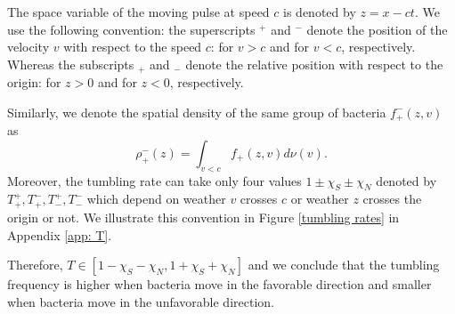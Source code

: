 \documentclass[11pt,twoside]{article}
\numberwithin{equation}{section}
\theoremstyle{plain}
\theoremstyle{nonumberplain}
\begin{document}
The space variable of the moving pulse at speed $c$ is denoted by $z = x-ct$.
We use the following convention: the superscripts $^+$ and $^-$ denote the position of the velocity $v$ with respect to the speed $c$: for $v>c$ and for $v<c$, respectively. Whereas the subscripts $_+$ and $_-$ denote the relative position with respect to the origin: for $z>0$ and for $z<0$, respectively. 


Similarly, we denote the spatial density of the same group of bacteria $f^-_+(z,v)$ as 
\[
    \rho^-_+(z) = \int_{v<c} f_+(z,v)d\nu(v).
\]
Moreover, the tumbling rate can take only four values $1\pm\chi_S\pm\chi_N$ denoted by $T^+_+, T^-_+, T^+_-, T^-_-$ which depend on weather $v$ crosses $c$ or weather $z$ crosses the origin or not. We illustrate this convention in Figure \ref{tumbling rates} in Appendix \ref{app: T}.




Therefore, $T\in[1-\chi_S-\chi_N, 1+\chi_S+\chi_N]$ and we conclude that the tumbling frequency is higher when bacteria move in the favorable direction and smaller when bacteria move in the unfavorable direction.
\end{document}
